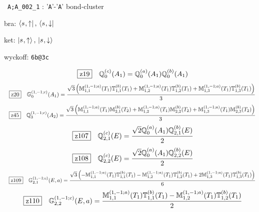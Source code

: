 \documentclass[fleqn,10pt,landscape]{jsarticle}
\begin{document}
\noindent\textbullet\, \texttt{A;A_002_1} : '\texttt{A}'-'\texttt{A}' bond-cluster

\noindent\quad * bra: $\bra{s_{},\uparrow},\, \bra{s_{},\downarrow}$

\noindent\quad * ket: $\ket{s_{},\uparrow},\, \ket{s_{},\downarrow}$

\noindent\quad * wyckoff: \texttt{6b@3c}

\begin{dmath*}
\hspace*{3mm}\fbox{z19}\quad \mathbb{Q}_{0}^{(c)}(A_{1})=\mathbb{Q}_{0}^{(a)}(A_{1}) \mathbb{Q}_{0}^{(b)}(A_{1})
\end{dmath*}
\begin{dmath*}
\hspace*{3mm}\fbox{z20}\quad \mathbb{G}_{0}^{(1,-1;c)}(A_{1})=\frac{\sqrt{3} \left(\mathbb{M}_{1,1}^{(1,-1;a)}(T_{1}) \mathbb{T}_{1,1}^{(b)}(T_{1}) + \mathbb{M}_{1,2}^{(1,-1;a)}(T_{1}) \mathbb{T}_{1,2}^{(b)}(T_{1}) + \mathbb{M}_{1,3}^{(1,-1;a)}(T_{1}) \mathbb{T}_{1,3}^{(b)}(T_{1})\right)}{3}
\end{dmath*}
\begin{dmath*}
\hspace*{3mm}\fbox{z45}\quad \mathbb{Q}_{3}^{(1,-1;c)}(A_{2})=\frac{\sqrt{3} \left(\mathbb{M}_{1,1}^{(1,-1;a)}(T_{1}) \mathbb{M}_{2,1}^{(b)}(T_{2}) + \mathbb{M}_{1,2}^{(1,-1;a)}(T_{1}) \mathbb{M}_{2,2}^{(b)}(T_{2}) + \mathbb{M}_{1,3}^{(1,-1;a)}(T_{1}) \mathbb{M}_{2,3}^{(b)}(T_{2})\right)}{3}
\end{dmath*}
\begin{dmath*}
\hspace*{3mm}\fbox{z107}\quad \mathbb{Q}_{2,1}^{(c)}(E)=\frac{\sqrt{2} \mathbb{Q}_{0}^{(a)}(A_{1}) \mathbb{Q}_{2,1}^{(b)}(E)}{2}
\end{dmath*}
\begin{dmath*}
\hspace*{3mm}\fbox{z108}\quad \mathbb{Q}_{2,2}^{(c)}(E)=\frac{\sqrt{2} \mathbb{Q}_{0}^{(a)}(A_{1}) \mathbb{Q}_{2,2}^{(b)}(E)}{2}
\end{dmath*}
\begin{dmath*}
\hspace*{3mm}\fbox{z109}\quad \mathbb{G}_{2,1}^{(1,-1;c)}(E,a)=\frac{\sqrt{3} \left(- \mathbb{M}_{1,1}^{(1,-1;a)}(T_{1}) \mathbb{T}_{1,1}^{(b)}(T_{1}) - \mathbb{M}_{1,2}^{(1,-1;a)}(T_{1}) \mathbb{T}_{1,2}^{(b)}(T_{1}) + 2 \mathbb{M}_{1,3}^{(1,-1;a)}(T_{1}) \mathbb{T}_{1,3}^{(b)}(T_{1})\right)}{6}
\end{dmath*}
\begin{dmath*}
\hspace*{3mm}\fbox{z110}\quad \mathbb{G}_{2,2}^{(1,-1;c)}(E,a)=\frac{\mathbb{M}_{1,1}^{(1,-1;a)}(T_{1}) \mathbb{T}_{1,1}^{(b)}(T_{1}) - \mathbb{M}_{1,2}^{(1,-1;a)}(T_{1}) \mathbb{T}_{1,2}^{(b)}(T_{1})}{2}
\end{dmath*}
\end{document}
